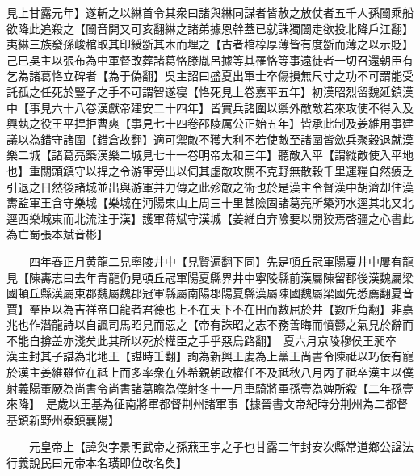 見上甘露元年】遂斬之以綝首令其衆曰諸與綝同謀者皆赦之放仗者五千人孫闓乘船欲降此追殺之【闓音開又可亥翻綝之諸弟據恩幹蓋已就誅獨闓走欲投北降戶江翻】夷綝三族發孫峻棺取其印綬斵其木而埋之【古者棺椁厚薄皆有度斵而薄之以示貶】己巳吳主以張布為中軍督改葬諸葛恪滕胤呂據等其罹恪等事遠徙者一切召還朝臣有乞為諸葛恪立碑者【為于偽翻】吳主詔曰盛夏出軍士卒傷損無尺寸之功不可謂能受託孤之任死於豎子之手不可謂智遂寑【恪死見上卷嘉平五年】初漢昭烈留魏延鎮漢中【事見六十八卷漢獻帝建安二十四年】皆實兵諸圍以禦外敵敵若來攻使不得入及興埶之役王平捍拒曹爽【事見七十四卷邵陵厲公正始五年】皆承此制及姜維用事建議以為錯守諸圍【錯倉故翻】適可禦敵不獲大利不若使敵至諸圍皆歛兵聚穀退就漢樂二城【諸葛亮築漢樂二城見七十一卷明帝太和三年】聽敵入平【謂縱敵使入平地也】重關頭鎮守以捍之令游軍旁出以伺其虚敵攻關不克野無散穀千里運糧自然疲乏引退之日然後諸城並出與游軍并力傳之此殄敵之術也於是漢主令督漢中胡濟却住漢夀監軍王含守樂城【樂城在沔陽東山上周三十里甚險固諸葛亮所築沔水逕其北又北逕西樂城東而北流注于漢】護軍蒋斌守漢城【姜維自弃險要以開狡焉啓疆之心書此為亡蜀張本斌音彬】

　　四年春正月黄龍二見寧陵井中【見賢遍翻下同】先是頓丘冠軍陽夏井中屢有龍見【陳夀志曰去年青龍仍見頓丘冠軍陽夏縣界井中寧陵縣前漢屬陳留郡後漢魏屬梁國頓丘縣漢屬東郡魏屬魏郡冠軍縣屬南陽郡陽夏縣漢屬陳國魏屬梁國先悉薦翻夏音賈】羣臣以為吉祥帝曰龍者君德也上不在天下不在田而數屈於井【數所角翻】非嘉兆也作潛龍詩以自諷司馬昭見而惡之【帝有誅昭之志不務善晦而憤鬰之氣見於辭而不能自揜盖亦淺矣此其所以死於權臣之手乎惡烏路翻】　夏六月京陵穆侯王昶卒　漢主封其子諶為北地王【諶時壬翻】詢為新興王䖍為上黨王尚書令陳祗以巧佞有寵於漢主姜維雖位在祗上而多率衆在外希親朝政權任不及祗秋八月丙子祗卒漢主以僕射義陽董厥為尚書令尚書諸葛瞻為僕射冬十一月車騎將軍孫壹為婢所殺【二年孫壹來降】　是歲以王基為征南將軍都督荆州諸軍事【據晉書文帝紀時分荆州為二都督基鎮新野州泰鎮襄陽】

　　元皇帝上【諱奐字景明武帝之孫燕王宇之子也甘露二年封安次縣常道鄉公諡法行義說民曰元帝本名璜即位改名奐】

